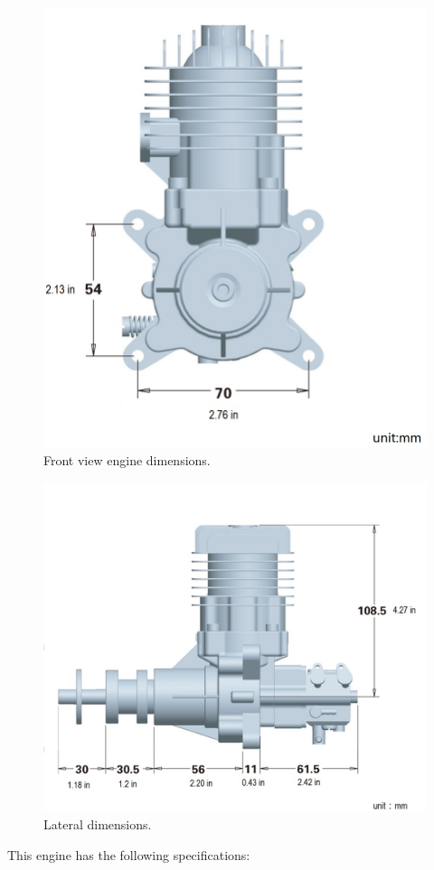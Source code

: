 \documentclass[english,fira]{ist-report}
\begin{document}
\begin{figure}[!ht]
	\centering
	\includegraphics[width = 0.6\linewidth]{graphics/engine_size.jpg}
	\caption{Front view engine dimensions.}
	\label{fig:Front view engine dimensions}
\end{figure}
\begin{figure}[!ht]
	\centering
	\includegraphics[width = 0.6\linewidth]{graphics/engine_size2.jpg}
	\caption{Lateral dimensions.}
	\label{fig:Lateral dimensions}
\end{figure}
This engine has the following specifications: \cite{rcgf} 
\end{document}
